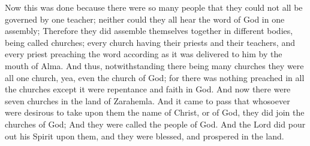 Now this was done because there were so many people that they could not all be governed by one teacher; neither could they all hear the word of God in one assembly;
\bverse \iffalse Therefore they did assemble themselves together in different bodies, being called churches; every church having their priests and their teachers, and every priest preaching the word according as it was delivered to him by the mouth of Alma. \fi
Therefore they did assemble themselves together in different bodies, being called churches; every church having their priests and their teachers, and every priest preaching the word according as it was delivered to him by the mouth of Alma.
\bverse \iffalse And thus, notwithstanding there being many churches they were all one church, yea, even the church of God; for there was nothing preached in all the churches except it were repentance and faith in God. \fi
And thus, notwithstanding there being many churches they were all one church, yea, even the church of God; for there was nothing preached in all the churches except it were repentance and faith in God.
\bverse \iffalse And now there were seven churches in the land of Zarahemla.  And it came to pass that whosoever were desirous to take upon them the name of Christ, or of God, they did join the churches of God; \fi
And now there were seven churches in the land of Zarahemla.  And it came to pass that whosoever were desirous to take upon them the name of Christ, or of God, they did join the churches of God;
\bverse \iffalse And they were called the people of God. And the Lord did pour out his Spirit upon them, and they were blessed, and prospered in the land. \fi
And they were called the people of God. And the Lord did pour out his Spirit upon them, and they were blessed, and prospered in the land.

